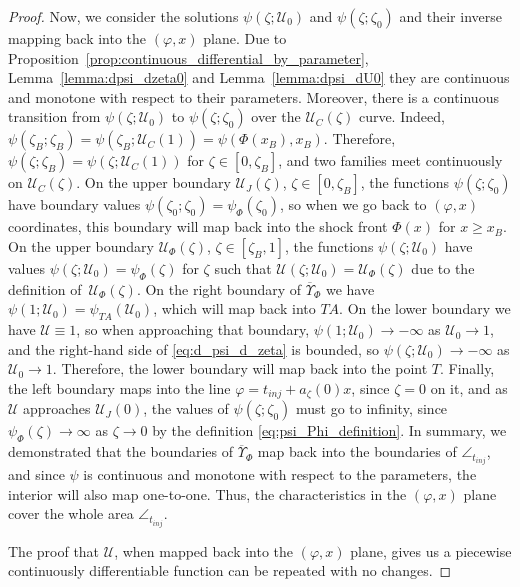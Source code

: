 \documentclass[12pt]{article}
\theoremstyle{definition}
\begin{document}
\begin{proof}
Now, we consider the solutions $\psi(\zeta; \mathcal U_0)$ and $\psi(\zeta; \zeta_0)$ and their inverse mapping
back into the $(\varphi, x)$ plane. Due to Proposition~\ref{prop:continuous_differential_by_parameter}, Lemma~\ref{lemma:dpsi_dzeta0} and Lemma~\ref{lemma:dpsi_dU0} they are continuous and monotone with respect to their parameters. Moreover, there is a continuous transition from $\psi(\zeta; \mathcal U_0)$ to $\psi(\zeta; \zeta_0)$ over the $\mathcal U_C(\zeta)$ curve. Indeed, $\psi(\zeta_B; \zeta_B) = \psi(\zeta_B; \mathcal U_C(1)) = \psi(\Phi(x_B), x_B)$. Therefore, $\psi(\zeta; \zeta_B) = \psi(\zeta; \mathcal U_C(1))$ for $\zeta\in[0,\zeta_B]$, and two families meet continuously on $\mathcal U_C(\zeta)$. On the upper boundary $\mathcal U_J(\zeta)$, $\zeta\in[0,\zeta_B]$, the functions $\psi(\zeta; \zeta_0)$ have boundary values $\psi(\zeta_0; \zeta_0) = \psi_\Phi(\zeta_0)$, so when we go back to $(\varphi, x)$ coordinates, this boundary will map back into the shock front $\Phi(x)$ for $x\geqslant x_B$. On the upper boundary $\mathcal U_\Phi(\zeta)$, $\zeta\in[\zeta_B,1]$, the functions $\psi(\zeta; \mathcal U_0)$ have values $\psi(\zeta; \mathcal U_0) = \psi_\Phi(\zeta)$ for $\zeta$ such that $\mathcal U(\zeta; \mathcal U_0) = \mathcal U_\Phi(\zeta)$ due to the definition of~$\mathcal U_\Phi(\zeta)$. On the right boundary of $\overline{\Upsilon}_\Phi$ we have $\psi(1; \mathcal U_0) = \psi_{TA}(\mathcal U_0)$, which will map back into $TA$. On the lower boundary we have $\mathcal U \equiv 1$, so when approaching that boundary, $\psi(1; \mathcal U_0) \to -\infty$ as $\mathcal U_0\to 1$, and the right-hand side of \eqref{eq:d_psi_d_zeta} is bounded, so $\psi(\zeta; \mathcal U_0) \to -\infty$ as $\mathcal U_0\to 1$. Therefore, the lower boundary will map back into the point $T$. Finally, the left boundary maps into the line $\varphi = t_{inj}+a_\zeta(0)x$, since $\zeta = 0$ on it, and as $\mathcal U$ approaches $\mathcal U_J(0)$, the values of $\psi(\zeta; \zeta_0)$ must go to infinity, since $\psi_\Phi(\zeta) \to \infty$ as $\zeta\to 0$ by the definition \eqref{eq:psi_Phi_definition}.
In summary, we demonstrated that the boundaries of $\overline{\Upsilon}_\Phi$ map back into the boundaries of $\angle_{t_{inj}}$, and since $\psi$ is continuous and monotone with respect to the parameters, the interior will also map one-to-one. Thus, the characteristics in the $(\varphi, x)$ plane cover the whole area $\angle_{t_{inj}}$.

The proof that $\mathcal U$, when mapped back into the $(\varphi, x)$ plane, gives us a piecewise continuously differentiable function can be repeated with no changes.
\end{proof}
\end{document}
